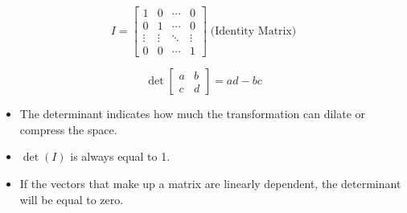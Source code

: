 \begin{minipage}{0.48\textwidth}
	\topic[Matrices]
	
	\[
		I
		= \begin{bmatrix} 
		1 & 0 & \cdots & 0\\ 
		0 & 1 & \cdots & 0 \\ 
		\vdots & \vdots & \ddots & \vdots \\ 
		0 & 0 & \cdots & 1
		\end{bmatrix} 
		\; \text{(Identity Matrix)}
	\]
	
	\vspace{0.30cm}
	
	\divider
	
	\[ \det \begin{bmatrix}
		a & b \\ 
		c & d
		\end{bmatrix}
		= 
		a d - b c 
	\] 
	\begin{itemize}
		\item The determinant indicates how much the transformation can dilate or compress the space.
		\item $\det(I)$ is always equal to 1.
		\item If the vectors that make up a matrix are linearly dependent, the determinant will be equal to zero. 
	\end{itemize}
	\divider
	  
\end{minipage}
\hfill
